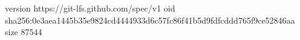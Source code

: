 version https://git-lfs.github.com/spec/v1
oid sha256:0e3aea1445b35e9824cd4444933d6c57fc86f41b5d9fdfcddd765f9ce52846aa
size 87544
